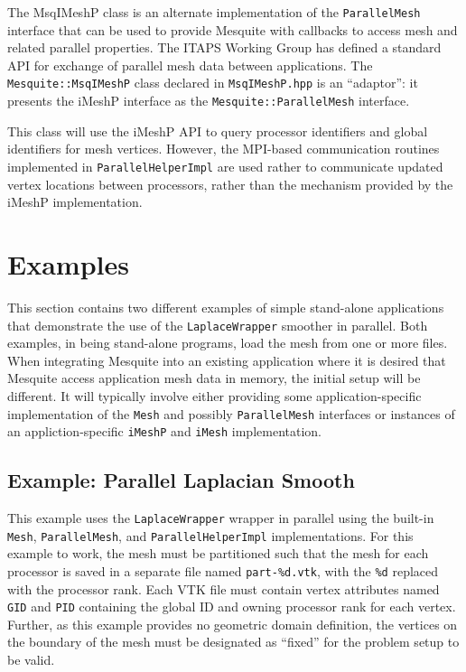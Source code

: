 The MsqIMeshP class is an alternate implementation of the \texttt{ParallelMesh} interface that can be used to provide Mesquite with callbacks to access mesh and related parallel properties.  The ITAPS Working Group has defined a standard API for exchange of parallel mesh data between applications. The \texttt{Mesquite::MsqIMeshP} class declared in \texttt{MsqIMeshP.hpp} is an ``adaptor'':  it presents the iMeshP interface as the \texttt{Mesquite::ParallelMesh} interface.  

This class will use the iMeshP API to query processor identifiers and global identifiers for mesh vertices.  However, the MPI-based communication routines implemented in \texttt{ParallelHelperImpl} are used rather to communicate updated vertex locations between processors, rather than the mechanism provided by the iMeshP implementation.

\section{Examples}

This section contains two different examples of simple stand-alone applications that demonstrate the use of the \texttt{LaplaceWrapper} smoother in parallel.  Both examples, in being stand-alone programs, load the mesh from one or more files.  When integrating Mesquite into an existing application where it is desired that Mesquite access application mesh data in memory, the initial setup will be different.  It will typically involve either providing some application-specific implementation of the \texttt{Mesh} and possibly \texttt{ParallelMesh} interfaces or instances of an appliction-specific \texttt{iMeshP} and \texttt{iMesh} implementation.

\subsection{Example: Parallel Laplacian Smooth}
\label{sec:parallel-example-1}

This example uses the \texttt{LaplaceWrapper} wrapper in parallel using the built-in \texttt{Mesh}, \texttt{ParallelMesh}, and \texttt{ParallelHelperImpl} implementations.  For this example to work, the mesh must be partitioned such that the mesh for each processor is saved in a separate file named \texttt{part-\%d.vtk}, with the \texttt{\%d} replaced with the processor rank.  Each VTK file must contain vertex attributes named \texttt{GID} and \texttt{PID} containing the global ID and owning processor rank for each vertex.  Further, as this example provides no geometric domain definition, the vertices on the boundary of the mesh must be designated as ``fixed'' for the problem setup to be valid.


